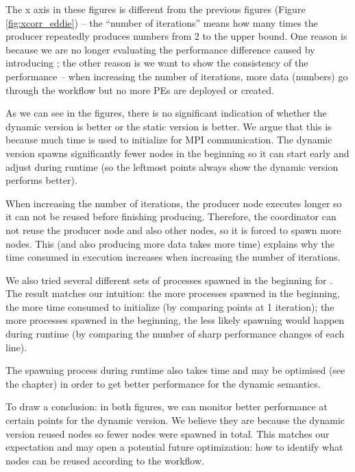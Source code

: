 The x axis in these figures is different from the previous figures (\eg Figure \ref{fig:xcorr_eddie}) -- the ``number of iterations'' means how many times the producer repeatedly produces numbers from 2 to the upper bound. One reason is because we are no longer evaluating the performance difference caused by introducing \tincdep; the other reason is we want to show the consistency of the performance -- when increasing the number of iterations, more data (numbers) go through the workflow but no more PEs are deployed or created.

As we can see in the figures, there is no significant indication of whether the dynamic version is better or the static version is better. We argue that this is because much time is used to initialize for MPI communication. The dynamic version spawns significantly fewer nodes in the beginning so it can start early and adjust during runtime (so the leftmost points always show the dynamic version performs better). 

When increasing the number of iterations, the producer node executes longer so it can not be reused before finishing producing. Therefore, the coordinator can not reuse the producer node and also other nodes, so it is forced to spawn more nodes. This (and also producing more data takes more time) explains why the time consumed in execution increases when increasing the number of iterations.

We also tried several different sets of processes spawned in the beginning for \tdynexp. The result matches our intuition: the more processes spawned in the beginning, the more time consumed to initialize (by comparing points at 1 iteration); the more processes spawned in the beginning, the less likely spawning would happen during runtime (by comparing the number of sharp performance changes of each line).

The spawning process during runtime also takes time and may be optimised (see the  chapter) in order to get better performance for the dynamic semantics.

To draw a conclusion: in both figures, we can monitor better performance at certain points for the dynamic version. We believe they are because the dynamic version reused nodes so fewer nodes were spawned in total. This matches our expectation and may open a potential future optimization: how to identify what nodes can be reused according to the workflow.
